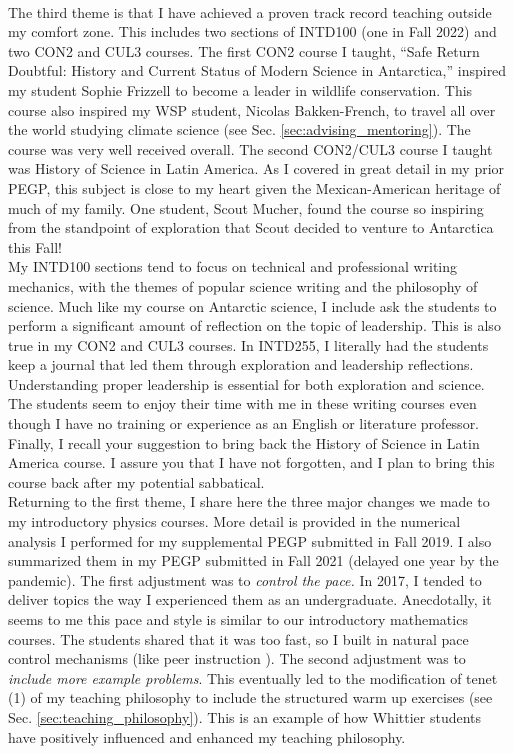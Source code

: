 \documentclass[../../../main.tex]{subfiles}
\begin{document}
\\
\vspace{0.15cm}
The third theme is that I have achieved a proven track record teaching outside my comfort zone.  This includes two sections of INTD100 (one in Fall 2022) and two CON2 and CUL3 courses.  The first CON2 course I taught, ``Safe Return Doubtful: History and Current Status of Modern Science in Antarctica,'' inspired my student Sophie Frizzell to become a leader in wildlife conservation.  This course also inspired my WSP student, Nicolas Bakken-French, to travel all over the world studying climate science (see Sec. \ref{sec:advising_mentoring}).  The course was very well received overall.  The second CON2/CUL3 course I taught was History of Science in Latin America.  As I covered in great detail in my prior PEGP, this subject is close to my heart given the Mexican-American heritage of much of my family.  One student, Scout Mucher, found the course so inspiring from the standpoint of exploration that Scout decided to venture to Antarctica this Fall!
\\
\vspace{0.15cm}
My INTD100 sections tend to focus on technical and professional writing mechanics, with the themes of popular science writing and the philosophy of science.  Much like my course on Antarctic science, I include ask the students to perform a significant amount of reflection on the topic of leadership.  This is also true in my CON2 and CUL3 courses.  In INTD255, I literally had the students keep a journal that led them through exploration and leadership reflections.  Understanding proper leadership is essential for both exploration and science.  The students seem to enjoy their time with me in these writing courses even though I have no training or experience as an English or literature professor.  Finally, I recall your suggestion to bring back the History of Science in Latin America course.  I assure you that I have not forgotten, and I plan to bring this course back after my potential sabbatical.
\\
\vspace{0.15cm}
Returning to the first theme, I share here the three major changes we made to my introductory physics courses.  More detail is provided in the numerical analysis I performed for my supplemental PEGP submitted in Fall 2019.  I also summarized them in my PEGP submitted in Fall 2021 (delayed one year by the pandemic).  The first adjustment was to \textit{control the pace.}  In 2017, I tended to deliver topics the way I experienced them as an undergraduate.  Anecdotally, it seems to me this pace and style is similar to our introductory mathematics courses.  The students shared that it was too fast, so I built in natural pace control mechanisms (like peer instruction \cite{mazur2013peer}).  The second adjustment was to \textit{include more example problems}.  This eventually led to the modification of tenet (1) of my teaching philosophy to include the structured warm up exercises (see Sec. \ref{sec:teaching_philosophy}).  This is an example of how Whittier students have positively influenced and enhanced my teaching philosophy.
\end{document}
